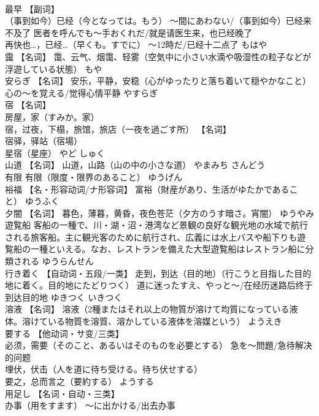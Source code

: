 \documentclass[8pt]{extreport}
\begin{document}
\begin{CJK}{UTF8}{min}
\\	最早	【副词】 
\\	（事到如今）已经（今となっては。もう） ～間にあわない/（事到如今）已经来不及了 医者を呼んでも～手おくれだ/就是请医生来，也已经晚了 
\\	再快也…，已经…（早くも。すでに） ～12時だ/已经十二点了	もはや	
\\	靄	【名词】 霭、云气、烟霭、轻雾（空気中に小さい水滴や吸湿性の粒子などが浮遊している状態）	もや	
\\	安らぎ	【名词】 安乐，平静，安稳（心がゆったりと落ち着いて穏やかなこと） 心の～を覚える/觉得心情平静	やすらぎ	
\\	宿	【名词】 
\\	房屋，家（すみか。家） 
\\	宿，过夜，下榻，旅馆，旅店（一夜を過ごす所） 【名词】 
\\	宿驿，驿站（宿場） 
\\	星宿（星座）	やど しゅく	
\\	山道	【名词】 山道，山路（山の中の小さな道）	やまみち さんどう	
\\	有限	有限（限度・限界のあること）	ゆうげん	
\\	裕福	【名・形容动词/ナ形容词】 富裕（財産があり、生活がゆたかであること）	ゆうふく	
\\	夕闇	【名词】 暮色，薄暮，黄昏，夜色苍茫（夕方のうす暗さ。宵闇）	ゆうやみ	
\\	遊覧船	客船の一種で、川・湖・沼・港湾など景観の良好な観光地の水域で航行される旅客船。主に観光客のために航行され、広義には水上バスや船下りも遊覧船の一種といえる。なお、レストランを備えた大型遊覧船はレストラン船に分類される	ゆうらんせん	
\\	行き着く	【自动词・五段/一类】 走到，到达（目的地）（行こうと目指した目的地に着く。目的地にたどりつく） 道に迷ったすえ、やっと～/在经历迷路后终于到达目的地	ゆきつく いきつく	
\\	溶液	【名词】 溶液（2種またはそれ以上の物質が溶けて均質になっている液体。溶けている物質を溶質、溶かしている液体を溶媒という）	ようえき	
\\	要する	【他动词・サ变/三类】 
\\	必须，需要（そのこと、あるいはそのものを必要とする） 急を～問題/急待解决的问题 
\\	埋伏，伏击（人を道に待ち受ける。待ち伏せする） 
\\	要之，总而言之（要約する）	ようする	
\\	用足し	【名词・自动・三类】 
\\	办事（用をすます） ～に出かける/出去办事 

\end{CJK}
\end{document}
